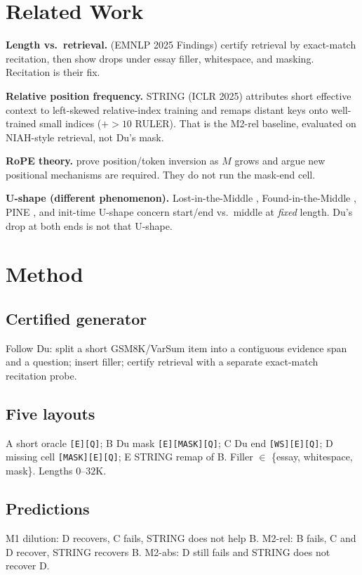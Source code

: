 \documentclass[11pt]{article}
\begin{document}
\section{Related Work}
\label{sec:related}
\textbf{Length vs.\ retrieval.} \citet{contextlength2025} (EMNLP 2025 Findings) certify retrieval by exact-match recitation, then show drops under essay filler, whitespace, and masking. Recitation is their fix.

\textbf{Relative position frequency.} STRING \citep{string2025} (ICLR 2025) attributes short effective context to left-skewed relative-index training and remaps distant keys onto well-trained small indices ($+{>}10$ RULER). That is the M2-rel baseline, evaluated on NIAH-style retrieval, not Du's mask.

\textbf{RoPE theory.} \citet{rope2026} prove position/token inversion as $M$ grows and argue new positional mechanisms are required. They do not run the mask-end cell.

\textbf{U-shape (different phenomenon).} Lost-in-the-Middle \citep{liu2024lost}, Found-in-the-Middle \citep{foundmiddle2024}, PINE \citep{pine2024}, and init-time U-shape \citep{chowdhury2026} concern start/end vs.\ middle at \emph{fixed} length. Du's drop at both ends is not that U-shape.

\section{Method}
\label{sec:method}
\subsection{Certified generator}
Follow Du: split a short GSM8K/VarSum item into a contiguous evidence span and a question; insert filler; certify retrieval with a separate exact-match recitation probe.

\subsection{Five layouts}
A short oracle \texttt{[E][Q]}; B Du mask \texttt{[E][MASK][Q]}; C Du end \texttt{[WS][E][Q]}; D missing cell \texttt{[MASK][E][Q]}; E STRING remap of B. Filler $\in$ \{essay, whitespace, mask\}. Lengths $0$--$32$K.

\subsection{Predictions}
M1 dilution: D recovers, C fails, STRING does not help B. M2-rel: B fails, C and D recover, STRING recovers B. M2-abs: D still fails and STRING does not recover D.
\end{document}
